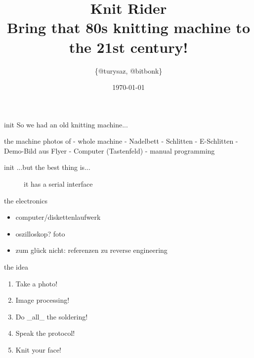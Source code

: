 


\author{\{@turysaz, @bitbonk\}}
\title{\Huge{Knit Rider}\\
    \large{Bring that 80s knitting machine to the 21st century!}
}

\date{\today{}}



\maketitle

\begin{frame}{init}
      So we had an old knitting machine...
\end{frame}


\begin{frame}{the machine}
photos of
- whole machine
- Nadelbett
- Schlitten
- E-Schlitten
- Demo-Bild aus Flyer
- Computer (Tastenfeld)
- manual programming
\end{frame}


\begin{frame}{init}
    ...but the best thing is...\pause
    \begin{figure}
        \caption{it has a serial interface }
    \end{figure}
\end{frame}


\begin{frame}{the electronics}
    \begin{itemize}
        \item computer/diskettenlaufwerk
        \item oszilloskop? foto
        \item zum glück nicht: referenzen zu reverse engineering
    \end{itemize}
\end{frame}


\begin{frame}{the idea}
    \begin{enumerate}[<+->]
        \item Take a photo!
        \item Image processing!
        \item Do \_all\_ the soldering!
        \item Speak the protocol!
        \item Knit your face!
    \end{enumerate}
\end{frame}



